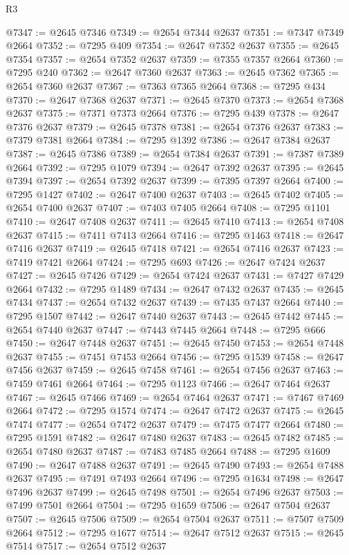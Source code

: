 \begin{lexlean}{R3}
\begin{coremodule}
@7347 := @2645 @7346
@7349 := @2654 @7344 @2637
@7351 := @7347 @7349 @2664
@7352 := @7295 @409
@7354 := @2647 @7352 @2637
@7355 := @2645 @7354
@7357 := @2654 @7352 @2637
@7359 := @7355 @7357 @2664
@7360 := @7295 @240
@7362 := @2647 @7360 @2637
@7363 := @2645 @7362
@7365 := @2654 @7360 @2637
@7367 := @7363 @7365 @2664
@7368 := @7295 @434
@7370 := @2647 @7368 @2637
@7371 := @2645 @7370
@7373 := @2654 @7368 @2637
@7375 := @7371 @7373 @2664
@7376 := @7295 @439
@7378 := @2647 @7376 @2637
@7379 := @2645 @7378
@7381 := @2654 @7376 @2637
@7383 := @7379 @7381 @2664
@7384 := @7295 @1392
@7386 := @2647 @7384 @2637
@7387 := @2645 @7386
@7389 := @2654 @7384 @2637
@7391 := @7387 @7389 @2664
@7392 := @7295 @1079
@7394 := @2647 @7392 @2637
@7395 := @2645 @7394
@7397 := @2654 @7392 @2637
@7399 := @7395 @7397 @2664
@7400 := @7295 @1427
@7402 := @2647 @7400 @2637
@7403 := @2645 @7402
@7405 := @2654 @7400 @2637
@7407 := @7403 @7405 @2664
@7408 := @7295 @1101
@7410 := @2647 @7408 @2637
@7411 := @2645 @7410
@7413 := @2654 @7408 @2637
@7415 := @7411 @7413 @2664
@7416 := @7295 @1463
@7418 := @2647 @7416 @2637
@7419 := @2645 @7418
@7421 := @2654 @7416 @2637
@7423 := @7419 @7421 @2664
@7424 := @7295 @693
@7426 := @2647 @7424 @2637
@7427 := @2645 @7426
@7429 := @2654 @7424 @2637
@7431 := @7427 @7429 @2664
@7432 := @7295 @1489
@7434 := @2647 @7432 @2637
@7435 := @2645 @7434
@7437 := @2654 @7432 @2637
@7439 := @7435 @7437 @2664
@7440 := @7295 @1507
@7442 := @2647 @7440 @2637
@7443 := @2645 @7442
@7445 := @2654 @7440 @2637
@7447 := @7443 @7445 @2664
@7448 := @7295 @666
@7450 := @2647 @7448 @2637
@7451 := @2645 @7450
@7453 := @2654 @7448 @2637
@7455 := @7451 @7453 @2664
@7456 := @7295 @1539
@7458 := @2647 @7456 @2637
@7459 := @2645 @7458
@7461 := @2654 @7456 @2637
@7463 := @7459 @7461 @2664
@7464 := @7295 @1123
@7466 := @2647 @7464 @2637
@7467 := @2645 @7466
@7469 := @2654 @7464 @2637
@7471 := @7467 @7469 @2664
@7472 := @7295 @1574
@7474 := @2647 @7472 @2637
@7475 := @2645 @7474
@7477 := @2654 @7472 @2637
@7479 := @7475 @7477 @2664
@7480 := @7295 @1591
@7482 := @2647 @7480 @2637
@7483 := @2645 @7482
@7485 := @2654 @7480 @2637
@7487 := @7483 @7485 @2664
@7488 := @7295 @1609
@7490 := @2647 @7488 @2637
@7491 := @2645 @7490
@7493 := @2654 @7488 @2637
@7495 := @7491 @7493 @2664
@7496 := @7295 @1634
@7498 := @2647 @7496 @2637
@7499 := @2645 @7498
@7501 := @2654 @7496 @2637
@7503 := @7499 @7501 @2664
@7504 := @7295 @1659
@7506 := @2647 @7504 @2637
@7507 := @2645 @7506
@7509 := @2654 @7504 @2637
@7511 := @7507 @7509 @2664
@7512 := @7295 @1677
@7514 := @2647 @7512 @2637
@7515 := @2645 @7514
@7517 := @2654 @7512 @2637

\end{coremodule}
\end{lexlean}
